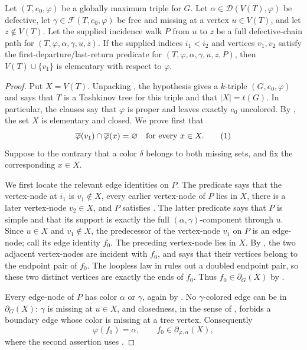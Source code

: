 \begin{lemma}
Let $(T,e_0,\varphi)$ be a globally maximum triple for $G$.  Let
$\alpha\in\mathcal D(V(T),\varphi)$ be defective, let
$\gamma\in\mathcal F(T,e_0,\varphi)$ be free and missing at a vertex
$u\in V(T)$, and let $z\notin V(T)$.  Let the supplied incidence walk $P$
from $u$ to $z$ be a full defective-chain path for
$(T,\varphi,\alpha,\gamma,u,z)$.  If the supplied indices $i_1<i_2$ and
vertices $v_1,v_2$ satisfy the first-departure/last-return predicate for
$(T,\varphi,\alpha,\gamma,u,z,P)$, then $V(T)\cup\{v_1\}$ is elementary
with respect to $\varphi$.
\end{lemma}
\begin{proof}
Put $X=V(T)$.  Unpacking , the hypothesis
gives a $k$-triple $(G,e_0,\varphi)$ and says that $T$ is a Tashkinov tree
for this triple and that $|X|=t(G)$.  In particular, the
 clauses say that $\varphi$ is proper and leaves exactly
$e_0$ uncolored.  By , the set $X$ is
elementary and closed.  We prove first that
\[
 \overline\varphi(v_1)\cap\overline\varphi(x)=\varnothing
 \quad\hbox{for every }x\in X. \tag{1}
\]
Suppose to the contrary that a color $\delta$ belongs to both missing
sets, and fix the corresponding $x\in X$.

We first locate the relevant edge identities on $P$.  The predicate
 says that the vertex-node at $i_1$ is
$v_1\notin X$, every earlier vertex-node of $P$ lies in $X$, there is a
later vertex-node $v_2\in X$, and $P$ satisfies
.  The latter predicate says that $P$
is simple and that its support is exactly the full
$(\alpha,\gamma)$-component through $u$.  Since $u\in X$ and
$v_1\notin X$, the predecessor of the vertex-node $v_1$ on $P$ is an
edge-node; call its edge identity $f_0$.  The preceding vertex-node lies
in $X$.  By , the two adjacent
vertex-nodes are incident with $f_0$, and  says that
their vertices belong to the endpoint pair of $f_0$.  The loopless law in
 rules out a doubled endpoint pair, so these
two distinct vertices are exactly the ends of $f_0$.  Thus
$f_0\in\partial_G(X)$ by .

Every edge-node of $P$ has color $\alpha$ or $\gamma$, again by
.  No $\gamma$-colored edge can be in
$\partial_G(X)$: $\gamma$ is missing at $u\in X$, and closedness, in the
sense of , forbids a boundary edge whose
color is missing at a tree vertex.  Consequently
\[
 \varphi(f_0)=\alpha,
 \qquad
 f_0\in\partial_{\varphi,\alpha}(X), \tag{2}
\]
where the second assertion uses .


\end{proof}

